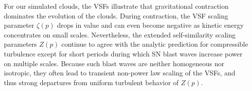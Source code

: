 For our simulated clouds, the VSFs illustrate that gravitational contraction dominates the evolution of the clouds.  During contraction, the VSF scaling parameter $\zeta(p)$ drops in value and can even become negative as kinetic energy concentrates on small scales.  Nevertheless, the extended self-similarity scaling parameters $Z(p)$ continue to agree with the analytic prediction for compressible turbulence except for short periods during which SN blast waves 
    increase power on multiple scales.  Because such blast waves are neither
    homogeneous nor isotropic, they often lead to transient non-power law 
    scaling of the VSFs, and thus strong departures from uniform turbulent behavior 
    of $Z(p)$. 



\endinput

